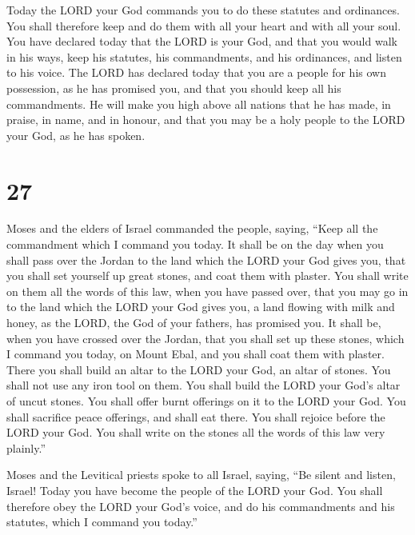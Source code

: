  Today the LORD your God commands you to do these
statutes and ordinances. You shall therefore keep and do them with all
your heart and with all your soul.  You have declared
today that the LORD is your God, and that you would walk in his ways,
keep his statutes, his commandments, and his ordinances, and listen to
his voice.  The LORD has declared today that you are a
people for his own possession, as he has promised you, and that you
should keep all his commandments.  He will make you high
above all nations that he has made, in praise, in name, and in honour,
and that you may be a holy people to the LORD your God, as he has
spoken.

\hypertarget{section-26}{%
\section{27}\label{section-26}}

 Moses and the elders of Israel commanded the people,
saying, ``Keep all the commandment which I command you today.
 It shall be on the day when you shall pass over the
Jordan to the land which the LORD your God gives you, that you shall set
yourself up great stones, and coat them with plaster.  You
shall write on them all the words of this law, when you have passed
over, that you may go in to the land which the LORD your God gives you,
a land flowing with milk and honey, as the LORD, the God of your
fathers, has promised you.  It shall be, when you have
crossed over the Jordan, that you shall set up these stones, which I
command you today, on Mount Ebal, and you shall coat them with plaster.
 There you shall build an altar to the LORD your God, an
altar of stones. You shall not use any iron tool on them. 
You shall build the LORD your God's altar of uncut stones. You shall
offer burnt offerings on it to the LORD your God.  You
shall sacrifice peace offerings, and shall eat there. You shall rejoice
before the LORD your God.  You shall write on the stones
all the words of this law very plainly.''

 Moses and the Levitical priests spoke to all Israel,
saying, ``Be silent and listen, Israel! Today you have become the people
of the LORD your God.  You shall therefore obey the LORD
your God's voice, and do his commandments and his statutes, which I
command you today.''

